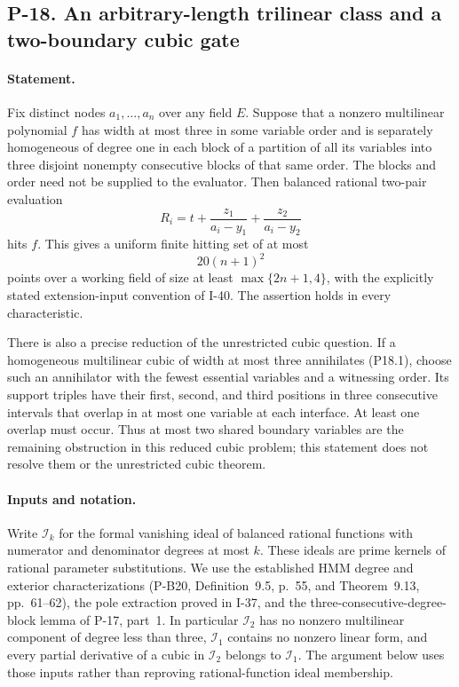 \subsection{P-18. An arbitrary-length trilinear class and a two-boundary cubic gate}
\label{P-18}

\paragraph{Statement.}
Fix distinct nodes $a_1,\ldots,a_n$ over any field $E$.
Suppose that a nonzero multilinear polynomial $f$ has width at
most three in some variable order and is separately homogeneous
of degree one in each block of a partition of all its variables
into three disjoint nonempty consecutive blocks of that same
order. The blocks and order need not be supplied to
the evaluator. Then balanced rational two-pair evaluation
\[
 R_i=t+\frac{z_1}{a_i-y_1}+\frac{z_2}{a_i-y_2}
 \tag{P18.1}
\]
hits $f$. This gives a uniform finite hitting set of at most
\[
 20(n+1)^2
 \tag{P18.2}
\]
points over a working field of size at least
$\max\{2n+1,4\}$, with the explicitly stated extension-input
convention of I-40. The assertion holds in every characteristic.

There is also a precise reduction of the unrestricted cubic
question. If a homogeneous multilinear cubic of width at most
three annihilates (P18.1), choose such an annihilator with the
fewest essential variables and a witnessing order. Its support
triples have their first, second, and third positions in three
consecutive intervals that overlap in at most one variable at
each interface. At least one overlap must occur. Thus at most
two shared boundary variables are the remaining obstruction
in this reduced cubic problem; this statement does not resolve
them or the unrestricted cubic theorem.

\paragraph{Inputs and notation.}
Write $\mathcal I_k$ for the formal vanishing ideal of balanced
rational functions with numerator and denominator degrees at
most $k$. These ideals are prime kernels of rational parameter
substitutions. We use the established HMM degree and exterior
characterizations (P-B20, Definition~9.5, p.~55, and
Theorem~9.13, pp.~61--62), the pole extraction proved in I-37,
and the three-consecutive-degree-block lemma of P-17, part~1.
In particular $\mathcal I_2$ has no nonzero multilinear component
of degree less than three, $\mathcal I_1$ contains no nonzero
linear form, and every partial derivative of a cubic in
$\mathcal I_2$ belongs to $\mathcal I_1$.
The argument below uses those inputs rather than reproving
rational-function ideal membership.

